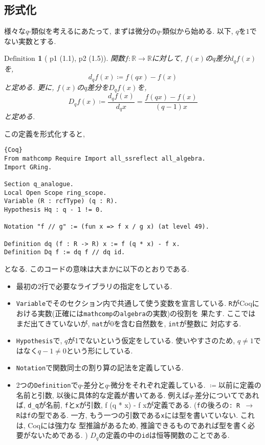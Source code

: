 \documentclass[11pt]{jarticle}
\theoremstyle{mystyle}
\newtheorem{df}{$\textrm{Definition}$}[subsection]
\newcommand{\bdf}{\begin{shadebox} \begin{df}}
\newcommand{\edf}{\end{df} \end{shadebox}}
\newcommand{\R}{\mathbb{R}}
\newcommand{\0}{\textbf{0}}
\newcommand{\1}{\textbf{1}}
\newcommand{\2}{\textbf{2}}
\begin{document}
\subsection{形式化}
様々な$q$-類似を考えるにあたって, まずは微分の$q$-類似から始める. 以下, $q$を$1$でない実数とする. 
\bdf[\cite{Kac} p1 (1.1), p2 (1.5)]
  関数$f : \R \to \R$に対して, $f(x)$の$q$差分$d_q f(x)$を, 
  \[
    d_q f(x) \coloneqq f (qx) - f(x)
  \]
  と定める. 更に, $f(x)$の$q$差分を$D_q f(x)$を, 
  \[
    D_q f(x) \coloneqq \frac{d_q f(x)}{d_q x} = \frac{f(qx) - f(x)}{(q - 1) x}
  \]
  と定める. 
\edf
この定義を形式化すると, 
\begin{lstlisting}{Coq}
From mathcomp Require Import all_ssreflect all_algebra.
Import GRing.

Section q_analogue.
Local Open Scope ring_scope.
Variable (R : rcfType) (q : R).
Hypothesis Hq : q - 1 != 0.

Notation "f // g" := (fun x => f x / g x) (at level 49).

Definition dq (f : R -> R) x := f (q * x) - f x.
Definition Dq f := dq f // dq id. 
\end{lstlisting}
となる. このコードの意味は大まかに以下のとおりである. 
\begin{itemize}
  \item 最初の2行で必要なライブラリの指定をしている. 
  \item {\tt Variable}でそのセクション内で共通して使う変数を宣言している. 
          {\tt R}がCoqにおける実数(正確には{\tt mathcomp}の{\tt algebra}の実数)の役割を
          果たす. ここではまだ出てきていないが, {\tt nat}が$0$を含む自然数を, {\tt int}が整数に
          対応する. 
  \item {\tt Hypothesis}で, $q$が1でないという仮定をしている. 使いやすさのため, 
          $q \ne 1$ではなく$q - 1 \ne 0$という形にしている. 
  \item {\tt Notation}で関数同士の割り算の記法を定義している. 
  \item 2つの{\tt Definition}で$q$-差分と$q$-微分をそれぞれ定義している. 
          {\tt $\coloneqq$}以前に定義の名前と引数, 以後に具体的な定義が書いてある. 
          例えば$q$-差分についてであれば, {\tt d\_q}が名前, {\tt f}と{\tt x}が引数, 
          {f (q * x) - f x}が定義である. ({\tt f}の後ろの{\tt : R $\to$ R}は{\tt f}の型である. 
          一方, もう一つの引数である{\tt x}には型を書いていない. これは, Coqには強力な
          型推論があるため, 推論できるものであれば型を書く必要がないためである. )
          $D_q$の定義の中の{\tt id}は恒等関数のことである. 
\end{itemize}
\end{document}

